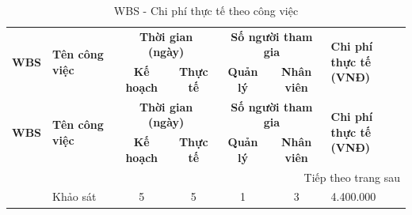 \clearpage
\begin{longtable}{|c|p{3cm}|c|c|c|c|p{3cm}|}
    \caption{WBS - Chi phí thực tế theo công việc}                                                                                                                                                                                                                                                         \\
    \hline
    \multirow{2}{*}{\textbf{WBS}}   & \multirow{2}{*}{\textbf{Tên công việc}}                       & \multicolumn{2}{c|}{\textbf{Thời gian (ngày)}} & \multicolumn{2}{c|}{\textbf{Số người tham gia}} & \multirow{2}{*}{\parbox{3cm}{\centering \textbf{Chi phí thực tế                                   \\ (VNĐ)}}} \\ \cline{3-6}
                                    &                                                               & \textbf{Kế hoạch}                              & \textbf{Thực tế}                                & \textbf{Quản lý}                                                & \textbf{Nhân viên} &            \\ \hline
    \endfirsthead
    \hline
    \multirow{2}{*}{\textbf{WBS}}   & \multirow{2}{*}{\textbf{Tên công việc}}                       & \multicolumn{2}{c|}{\textbf{Thời gian (ngày)}} & \multicolumn{2}{c|}{\textbf{Số người tham gia}} & \multirow{2}{*}{\parbox{3cm}{\centering \textbf{Chi phí thực tế                                   \\ (VNĐ)}}} \\ \cline{3-6}
                                    &                                                               & \textbf{Kế hoạch}                              & \textbf{Thực tế}                                & \textbf{Quản lý}                                                & \textbf{Nhân viên} &            \\ \hline
    \endhead
    \hline \multicolumn{7}{|r|}{{Tiếp theo trang sau}}                                                                                                                                                                                                                                                     \\ \hline
    \endfoot
    \hline
    \endlastfoot
    1                               & Khảo sát                                                      & 5                                              & 5                                               & 1                                                               & 3                  & 4.400.000  \\ \hline

\end{longtable}
